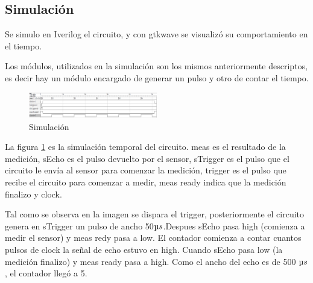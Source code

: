 \documentclass[../../e3_tp2_main.tex]{subfiles}
\begin{document}
\subsection{Simulación}
Se simulo en Iverilog el circuito, y con gtkwave se visualizó su comportamiento en el tiempo.
\par Los módulos, utilizados en la simulación son los mismos anteriormente descriptos, es decir hay un módulo encargado de generar un pulso y otro de contar el tiempo.
\begin{figure}[H]	
	\centering
	\includegraphics[width=0.5\textwidth]{imagenes/gtksim.png}
	\caption{Simulación}\label{fig:simg}
\end{figure}

La figura \ref{fig:simg} es la simulación temporal del circuito. meas es el resultado de la medición, sEcho es el pulso devuelto por el sensor, sTrigger es el pulso que el circuito le envía al sensor para comenzar la medición, trigger es el pulso que recibe el circuito para comenzar a medir, meas ready indica que la medición finalizo y clock.
\par Tal como se observa en la imagen se dispara el trigger, posteriormente el circuito genera en sTrigger un pulso de ancho 50$\micro s$.Despues sEcho pasa high (comienza a medir el sensor) y meas redy pasa a low. El contador comienza a contar cuantos pulsos de clock la señal de echo estuvo en high. Cuando sEcho pasa low (la medición  finalizo) y meas ready pasa a high. Como el ancho del echo es de 500 $\micro s$, el contador llegó a 5.
\end{document}
